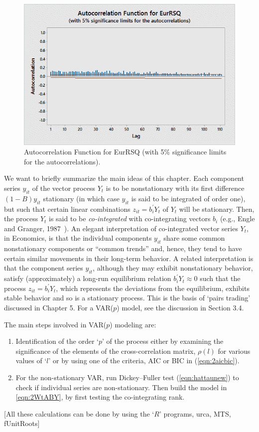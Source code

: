 	\begin{figure}[!ht]
	\centering
	\includegraphics[width=\textwidth]{chapters/chapter_mvts/figures/pautofun3.png}
	\caption{Autocorrelation Function for EurRSQ (with 5\% significance limits for the autocorrelations). \label{fig:pautofun3}}
	\end{figure}


We want to briefly summarize the main ideas of this chapter. Each component series $y_{it}$ of the vector process $Y_t$ is to be nonstationary with its first difference $(1\!-\!B) y_{it}$ stationary (in which case $y_{it}$ is said to be integrated of order one), but such that certain linear combinations $z_{it} = b_i^{\prime} Y_t $ of $Y_t$ will be stationary. Then, the process $Y_t$ is said to be \emph{co-integrated} with co-integrating vectors $b_i$ (e.g., Engle and Granger, 1987~\cite{engle1987co}). An elegant interpretation of co-integrated vector series $Y_t$, in Economics, is that the individual components $y_{it}$ share some common nonstationary components or ``common trends'' and, hence, they tend to have certain similar movements in their long-term behavior. A related interpretation is that the component series $y_{it}$, although they may exhibit nonstationary behavior, satisfy (approximately) a long-run equilibrium relation $b_i^{\prime} Y_t \approx 0$ such that the process $z_{it} = b_i^{\prime} Y_t$, which represents the deviations from the equilibrium, exhibits stable behavior and so is a stationary process. This is the basis of `pairs trading' discussed in Chapter 5. For a VAR($p$) model, see the discussion in Section 3.4.


The main steps involved in VAR($p$) modeling are:
	\begin{enumerate}[--]
	\item Identification of the order `$p$' of the process either by examining the significance of the elements of the cross-correlation matrix, $\rho(l)$ for various values of `$l$' or by using one of the criteria, AIC or BIC in (\ref{eqn:2aicbic}).
	\item For the non-stationary VAR, run Dickey--Fuller test (\ref{eqn:hattaunew}) to check if individual series are non-stationary. Then build the model in \ref{eqn:2WtABY}, by first testing the co-integrating rank. 
	\end{enumerate}
[All these calculations can be done by using the `$R$' programs, urca, MTS, fUnitRoots]


